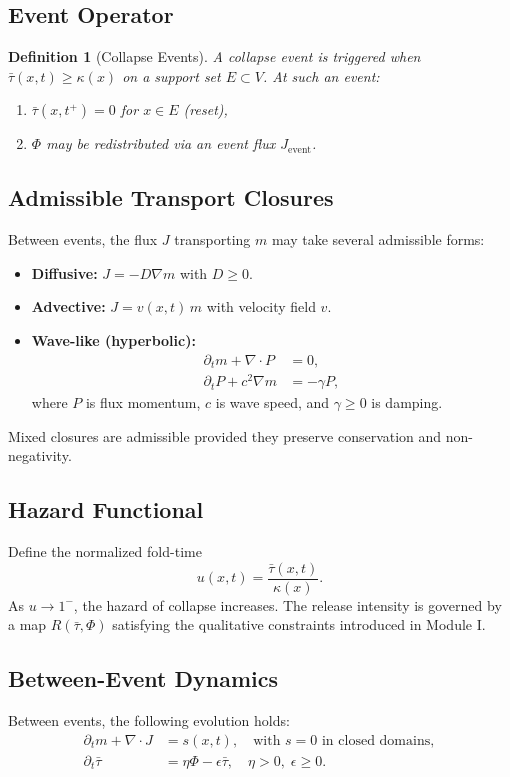 \documentclass[11pt]{article}
\newtheorem{definition}[theorem]{Definition}
\begin{document}
\subsection{Event Operator}
\begin{definition}[Collapse Events]
A collapse event is triggered when $\bar{\tau}(x,t) \geq \kappa(x)$ on a support set $E \subset V$. 
At such an event:
\begin{enumerate}[leftmargin=*]
    \item $\bar{\tau}(x,t^+) = 0$ for $x \in E$ (reset),
    \item $\Phi$ may be redistributed via an event flux $J_{\text{event}}$.
\end{enumerate}
\end{definition}

\subsection{Admissible Transport Closures}
Between events, the flux $J$ transporting $m$ may take several admissible forms:
\begin{itemize}[leftmargin=*]
    \item \textbf{Diffusive:} $J = -D \nabla m$ with $D \geq 0$.
    \item \textbf{Advective:} $J = v(x,t)\, m$ with velocity field $v$.
    \item \textbf{Wave-like (hyperbolic):}
    \begin{align*}
        \partial_t m + \nabla \cdot P &= 0, \\
        \partial_t P + c^2 \nabla m &= -\gamma P,
    \end{align*}
    where $P$ is flux momentum, $c$ is wave speed, and $\gamma \geq 0$ is damping.
\end{itemize}
Mixed closures are admissible provided they preserve conservation and non-negativity.

\subsection{Hazard Functional}
Define the normalized fold-time
\[
u(x,t) = \frac{\bar{\tau}(x,t)}{\kappa(x)}.
\]
As $u \to 1^-$, the hazard of collapse increases. The release intensity is governed by a map $R(\bar{\tau}, \Phi)$ satisfying the qualitative constraints introduced in Module I.

\subsection{Between-Event Dynamics}
Between events, the following evolution holds:
\begin{align*}
    \partial_t m + \nabla \cdot J &= s(x,t), \quad \text{with } s=0 \text{ in closed domains}, \\
    \partial_t \bar{\tau} &= \eta \Phi - \epsilon \bar{\tau}, \quad \eta > 0, \; \epsilon \geq 0.
\end{align*}
\end{document}
